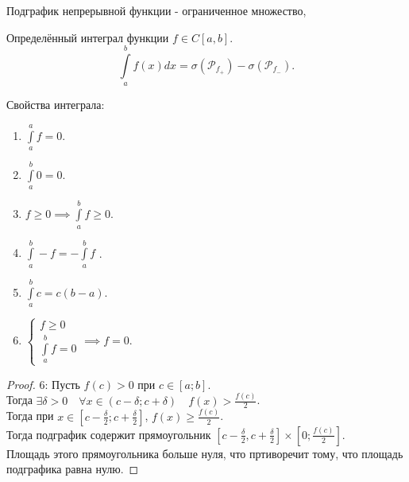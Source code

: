 \documentclass[11pt, oneside]{article}   	%
\begin{document}
    \begin{dlemma}
        Подграфик непрерывной функции - ограниченное множество,
    \end{dlemma}
    \begin{definition}
        Определённый интеграл функции $f\in C\left[a, b\right]$.\\
        \[ \int\limits_{a}^{b} f(x)dx = \sigma(\mathcal{P}_{f_+}) - \sigma(\mathcal{P}_{f_-})  .\] 
    \end{definition}
    \begin{dlemma} Свойства интеграла:
        \begin{enumerate}
            \item $\int\limits_{a}^{a} f = 0$.
            \item $ \int\limits_{a}^{b} 0 = 0$.
            \item $f \ge 0 \implies \int\limits_{a}^{b} f \ge 0$.
            \item $\int\limits_{a}^{b} -f = -\int\limits_{a}^{b} f$   .
            \item $\int\limits_{a}^{b} c = c(b-a)$.
            \item $\begin{cases}
                f \ge 0\\
                \int\limits_{a}^{b} f = 0 
            \end{cases} \implies f = 0$.
        \end{enumerate}
        \begin{proof}
            $6$: Пусть $f(c) > 0$ при $c\in \left[a; b\right]$.\\
            Тогда $\exists{\delta > 0}\quad \forall{x\in (c-\delta; c+\delta)}\quad f(x)>\frac{f(c)}{2}$.\\
            Тогда при $x\in \left[c-\frac{\delta}{2}; c+\frac{\delta}{2}\right]$, $f(x) \ge \frac{f(c)}{2}$.\\
            Тогда подграфик содержит прямоугольник $\left[c-\frac{\delta}{2}, c+\frac{\delta}{2}\right] \times \left[0; \frac{f(c)}{2}\right]$.\\
            Площадь этого прямоугольника больше нуля, что пртиворечит тому, что площадь подграфика равна нулю.
        \end{proof}
    \end{dlemma}
\end{document}
